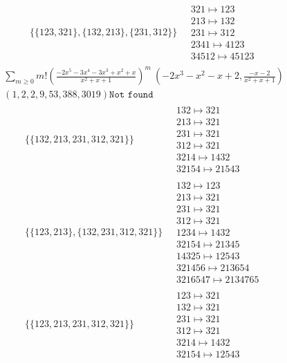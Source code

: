 \begin{scriptsize}
\begin{align}
\begin{matrix}
\end{matrix}
\\
\{\{123, 321\}, \{132, 213\}, \{231, 312\}\}
\ 
&
\begin{matrix}
321 \mapsto 123\\213 \mapsto 132\\231 \mapsto 312\\2341 \mapsto 4123\\34512 \mapsto 45123
\end{matrix}
\end{align}
$$
\begin{matrix}
\sum_{m \geq 0} m! \left(
\frac{-2 x^{5} - 3 x^{4} - 3 x^{3} + x^{2} + x}{x^{2} + x + 1}
\right)^m
\ 
\left(-2 x^{3} - x^{2} - x + 2, \frac{-x - 2}{x^{2} + x + 1}\right)
\\
\left(1, 2, 2, 9, 53, 388, 3019\right)
\texttt{Not found}
\end{matrix}
$$
\begin{align}
\{\{132, 213, 231, 312, 321\}\}
\ 
&
\begin{matrix}
132 \mapsto 321\\213 \mapsto 321\\231 \mapsto 321\\312 \mapsto 321\\3214 \mapsto 1432\\32154 \mapsto 21543
\end{matrix}
\\
\{\{123, 213\}, \{132, 231, 312, 321\}\}
\ 
&
\begin{matrix}
132 \mapsto 123\\213 \mapsto 321\\231 \mapsto 321\\312 \mapsto 321\\1234 \mapsto 1432\\32154 \mapsto 21345\\14325 \mapsto 12543\\321456 \mapsto 213654\\3216547 \mapsto 2134765
\end{matrix}
\\
\{\{123, 213, 231, 312, 321\}\}
\ 
&
\begin{matrix}
123 \mapsto 321\\132 \mapsto 321\\231 \mapsto 321\\312 \mapsto 321\\3214 \mapsto 1432\\32154 \mapsto 12543
\end{matrix}

\end{align}
\end{scriptsize}
